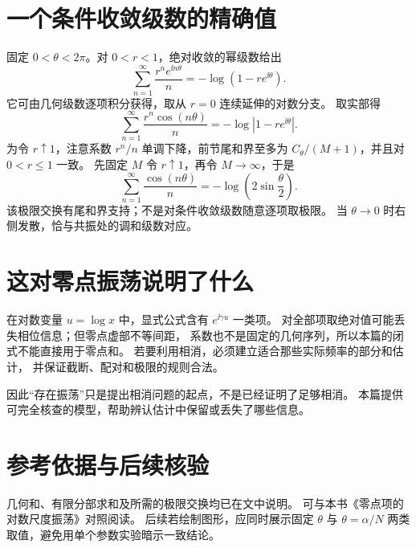 \documentclass[UTF8,fontset=fandol,11pt]{ctexart}
\begin{document}
\section{一个条件收敛级数的精确值}
固定 $0<\theta<2\pi$。对 $0<r<1$，绝对收敛的幂级数给出
\[
 \sum_{n=1}^\infty\frac{r^ne^{\ii n\theta}}n
 =-\log(1-re^{\ii\theta}).
\]
它可由几何级数逐项积分获得，取从 $r=0$ 连续延伸的对数分支。
取实部得
\[
 \sum_{n=1}^\infty\frac{r^n\cos(n\theta)}n
 =-\log|1-re^{\ii\theta}|.
\]
为令 $r\uparrow1$，注意系数 $r^n/n$ 单调下降，前节尾和界至多为
$C_\theta/(M+1)$，并且对 $0<r\le1$ 一致。
先固定 $M$ 令 $r\uparrow1$，再令 $M\to\infty$，于是
\[
 \sum_{n=1}^\infty\frac{\cos(n\theta)}n
 =-\log\left(2\sin\frac\theta2\right).
\]
该极限交换有尾和界支持；不是对条件收敛级数随意逐项取极限。
当 $\theta\to0$ 时右侧发散，恰与共振处的调和级数对应。

\section{这对零点振荡说明了什么}
在对数变量 $u=\log x$ 中，显式公式含有 $e^{\ii\gamma u}$ 一类项。
对全部项取绝对值可能丢失相位信息；但零点虚部不等间距，
系数也不是固定的几何序列，所以本篇的闭式不能直接用于零点和。
若要利用相消，必须建立适合那些实际频率的部分和估计，
并保证截断、配对和极限的规则合法。

因此“存在振荡”只是提出相消问题的起点，不是已经证明了足够相消。
本篇提供可完全核查的模型，帮助辨认估计中保留或丢失了哪些信息。

\section*{参考依据与后续核验}
几何和、有限分部求和及所需的极限交换均已在文中说明。
可与本书《零点项的对数尺度振荡》对照阅读。
后续若绘制图形，应同时展示固定 $\theta$ 与 $\theta=\alpha/N$ 两类取值，避免用单个参数实验暗示一致结论。
\end{document}

